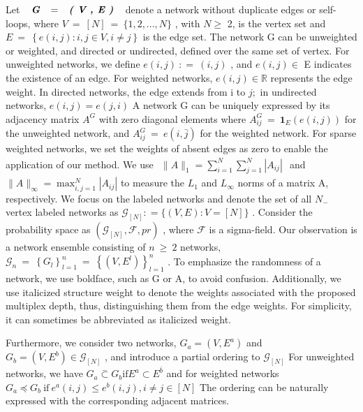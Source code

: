 \documentclass[
  10
]{article}
\begin{document}
Let \(\textbf { \textit { G } } = \textbf { \textit { ( V , E ) } }\)
denote a network without duplicate edges or self-loops, where
\(V ~ = ~ [ N ] ~ = ~ \{ 1 , 2 , . . . , N \}\) , with \(N \geq\) 2, is
the vertex set and
\(E ~ = ~ \left\{ e ( i , j ) : i , j \in V , i \neq j \right\}\) is the
edge set. The network G can be unweighted or weighted, and directed or
undirected, defined over the same set of vertex. For unweighted
networks, we define \(e ( i , j ) ~ : = ~ ( i , j )\) , and
\(e ( i , j ) \in\) E indicates the existence of an edge. For weighted
networks, \(e ( i , j ) \in \mathbb { R }\) represents the edge weight.
In directed networks, the edge extends from i to \(j ;\) in undirected
networks, \(e ( i , j ) = e ( j , i )\) A network G can be uniquely
expressed by its adjacency matrix \(A ^ { G }\) with zero diagonal
elements where
\(A _ { i j } ^ { G } ~ = ~ \mathbf { 1 } _ { E } ( e ( i , j ) )\) for
the unweighted network, and
\(A _ { i j } ^ { G } ~ = ~ e ( i , \bar { j } )\) for the weighted
network. For sparse weighted networks, we set the weights of absent
edges as zero to enable the application of our method. We use
\(\begin{array} { r } { \| A \| _ { 1 } = \sum _ { i = 1 } ^ { N } \sum _ { j = 1 } ^ { N } | A _ { i j } | } \end{array}\)
and
\(\| A \| _ { \infty } = \operatorname* { m a x } _ { i , j = 1 } ^ { N } | A _ { i j } |\)
to measure the \(L _ { 1 }\) and \(L _ { \infty }\) norms of a matrix A,
respectively. We focus on the labeled networks and denote the set of all
\(N _ { - }\) vertex labeled networks as
\(\mathcal { G } _ { [ N ] } : = \{ ( V , E ) : V = [ N ] \}\) .
Consider the probability space as
\(( \mathcal { G } _ { [ N ] } , \mathcal { F } , p r )\) , where
\(\mathcal { F }\) is a sigma-field. Our observation is a network
ensemble consisting of \(n \ \geq \ 2\) networks,
\({ { \mathcal G } _ { n } } \ = \ \left\{ { G } _ { l } \right\} _ { l = 1 } ^ { n } \ = \ \left\{ \left( V , { E } ^ { l } \right) \right\} _ { l = 1 } ^ { n }\)
. To emphasize the randomness of a network, we use boldface, such as G
or A, to avoid confusion. Additionally, we use italicized structure
weight to denote the weights associated with the proposed multiplex
depth, thus, distinguishing them from the edge weights. For simplicity,
it can sometimes be abbreviated as italicized weight.

Furthermore, we consider two networks, \(G _ { a } = ( V , E ^ { a } )\)
and \(G _ { b } = ( V , E ^ { b } ) \in \mathcal { G } _ { [ N ] }\) ,
and introduce a partial ordering to \(\mathcal { G } _ { [ N ] }\) For
unweighted networks, we have
\(G _ { a } \stackrel { - } { \subset } G _ { b } \mathrm { i f } E ^ { a } \subset E ^ { \bar { b } }\)
and for weighted networks
\(G _ { a } \preceq G _ { b } \mathrm { ~ i f ~ } e ^ { a } ( i , j ) \leq e ^ { b } ( i , j ) , i \neq j \in [ N ]\)
The ordering can be naturally expressed with the corresponding adjacent
matrices.
\end{document}
